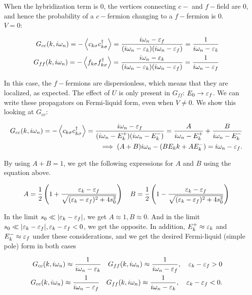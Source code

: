 When the hybridization term is $0$, the vertices connecting $c-$ and $f-$field are $0$, and hence the probability of a $c-$fermion changing to a $f-$fermion is 0. \\ 

$V = 0$: 

\begin{align*}
    G_{cc}(k,i\omega_n) = -\expval{c_{k\sigma} c_{k\sigma}^\dagger} = \frac{i\omega_n - \varepsilon_f}{(i\omega_n - \varepsilon_k)(i\omega_n - \varepsilon_f)} = \frac{1}{i\omega_n - \varepsilon_k} \\ 
    G_{ff}(k,i\omega_n) = -\expval{f_{k\sigma} f_{k\sigma}^\dagger} = \frac{i\omega_n - \varepsilon_k}{(i\omega_n - \varepsilon_k)(i\omega_n - \varepsilon_f)} = \frac{1}{i\omega_n - \varepsilon_f}
\end{align*}

In this case, the $f-$fermions are dispersionless, which means that they are localized, as expected. The effect of $U$ is only present in $G_{ff}$: $E_0 \to \varepsilon_f$. We can write these propagators on Fermi-liquid form, even when $V \neq 0$. We show this looking at $G_{cc}$:

\begin{align*}
    G_{cc}(k,i\omega_n) = -\expval{c_{k\sigma} c_{k\sigma}^\dagger} = \frac{i\omega_n - \ep_f}{(i\omega_n - E_k^+)(i\omega_n - E_k^-)} = \frac{A}{i\omega_n - E_k^+} + \frac{B}{i\omega_n - E_k^-} \\
    \implies (A + B)i\omega_n - (BE_k^^+ + AE_k^-) = i\omega_n - \ep_f. 
\end{align*}

By using $A + B = 1$, we get the following expressions for $A$ and $B$ using the equation above. 

\begin{align*}
    A = \frac{1}{2}\left( 1 + \frac{\varepsilon_k - \varepsilon_f}{\sqrt{(\varepsilon_k - \varepsilon_f)^2 + 4s_0^2}}\right) \quad B = \frac{1}{2}\left( 1 - \frac{\varepsilon_k - \varepsilon_f}{\sqrt{(\varepsilon_k - \varepsilon_f)^2 + 4s_0^2}}\right)
\end{align*}

In the limit $s_0 \ll \abs{\varepsilon_k - \varepsilon_f}$, we get $A \approx 1, B \approx 0$. And in the limit $s_0 \ll \abs{\varepsilon_k - \varepsilon_f}, \varepsilon_k - \varepsilon_f < 0$, we get the opposite. In addition, $E_k^+ \approx \varepsilon_k$ and $E_k^- \approx \varepsilon_f$ under these considerations, and we get the desired Fermi-liquid (simple pole) form in both cases

\begin{align*}
    G_{cc}(k,i\omega_n) \approx \frac{1}{i\omega_n - \varepsilon_k} \quad
    G_{ff}(k,i\omega_n) \approx \frac{1}{i\omega_n - \varepsilon_f}, \quad \varepsilon_k - \varepsilon_f > 0 \\
    G_{cc}(k,i\omega_n) \approx \frac{1}{i\omega_n - \varepsilon_f} \quad
    G_{ff}(k,i\omega_n) \approx \frac{1}{i\omega_n - \varepsilon_k}, \quad \varepsilon_k - \varepsilon_f < 0. 
\end{align*}

